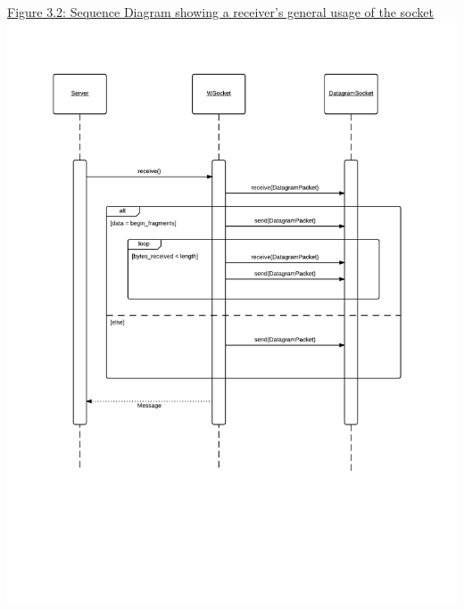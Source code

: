 \documentclass[11pt,english]{article}
\begin{document}
\newpage
\underline{Figure 3.2: Sequence Diagram showing a receiver's general usage of the socket}
\vspace{5mm}\\
\includegraphics[width=6.2in]{figures/comm-protocol_seq-diagram_server.png}
\end{document}
